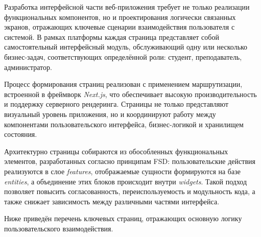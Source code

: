 Разработка интерфейсной части веб-приложения требует не только реализации функциональных компонентов, но и проектирования логически связанных экранов, отражающих ключевые сценарии взаимодействия пользователя с системой. В рамках платформы каждая страница представляет собой самостоятельный интерфейсный модуль, обслуживающий одну или несколько бизнес-задач, соответствующих определённой роли: студент, преподаватель, администратор.

Процесс формирования страниц реализован с применением маршрутизации, встроенной в фреймворк \textit{Next.js}, что обеспечивает высокую производительность и поддержку серверного рендеринга. Страницы не только представляют визуальный уровень приложения, но и координируют работу между компонентами пользовательского интерфейса, бизнес-логикой и хранилищем состояния.

Архитектурно страницы собираются из обособленных функциональных элементов, разработанных согласно принципам FSD: пользовательские действия реализуются в слое \textit{features}, отображаемые сущности формируются на базе \textit{entities}, а объединение этих блоков происходит внутри \textit{widgets}. Такой подход позволяет повысить согласованность, переиспользуемость и модульность кода, а также снижает зависимость между различными частями интерфейса.

Ниже приведён перечень ключевых страниц, отражающих основную логику пользовательского взаимодействия.

